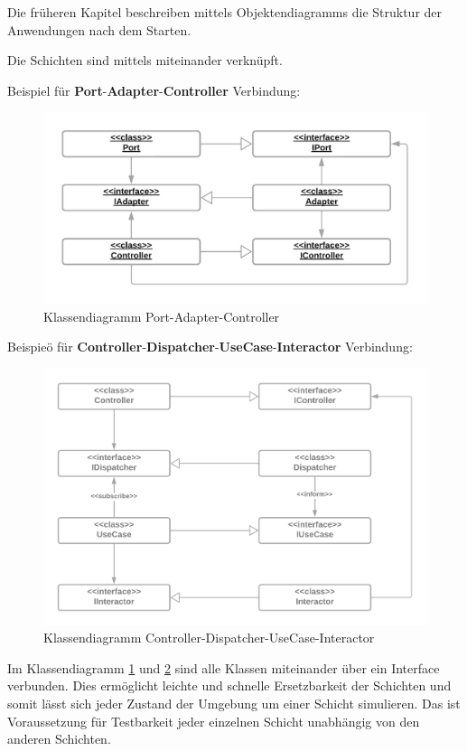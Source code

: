 Die früheren Kapitel beschreiben mittels Objektendiagramms die Struktur der Anwendungen nach dem Starten.

Die Schichten sind mittels \textbf{} miteinander verknüpft.

Beispiel für \textbf{Port}-\textbf{Adapter}-\textbf{Controller} Verbindung:

\begin{figure}[H]
    \centering
    \includegraphics[width=12cm]{./images/Klassendiagramm Port-Adapter.png}
    \caption[Klassendiagramm Port-Adapter-Controller]{Klassendiagramm Port-Adapter-Controller \footnotemark}
    \label{fig:FullCDPAC}
\end{figure}

Beispieö für \textbf{Controller}-\textbf{Dispatcher}-\textbf{UseCase}-\textbf{Interactor} Verbindung:
\begin{figure}[H]
    \centering
    \includegraphics[width=12cm]{./images/CDUI-Klassendiagramm.png}
    \caption[Klassendiagramm Controller-Dispatcher-UseCase-Interactor]{Klassendiagramm Controller-Dispatcher-UseCase-Interactor \footnotemark}
    \label{fig:FullCDCDUI}
\end{figure}

Im Klassendiagramm \ref{fig:FullCDPAC} und \ref{fig:FullCDCDUI} sind alle Klassen miteinander über ein Interface verbunden.
Dies ermöglicht leichte und schnelle Ersetzbarkeit der Schichten und 
somit lässt sich jeder Zustand der Umgebung um einer Schicht simulieren. 
Das ist Voraussetzung für Testbarkeit jeder einzelnen Schicht unabhängig von den anderen Schichten.